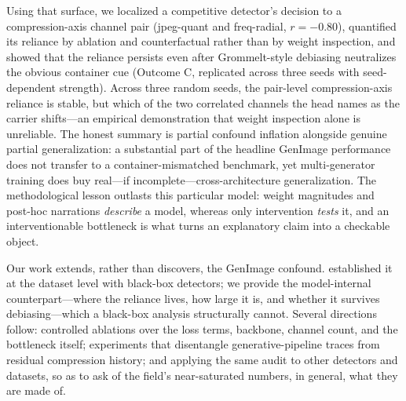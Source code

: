 Using that surface, we localized a competitive detector's decision to a compression-axis channel pair (jpeg-quant and freq-radial, $r{=}{-}0.80$), quantified its reliance by ablation and counterfactual rather than by weight inspection, and showed that the reliance persists even after Grommelt-style debiasing neutralizes the obvious container cue (Outcome C, replicated across three seeds with seed-dependent strength). Across three random seeds, the pair-level compression-axis reliance is stable, but which of the two correlated channels the head names as the carrier shifts---an empirical demonstration that weight inspection alone is unreliable. The honest summary is partial confound inflation alongside genuine partial generalization: a substantial part of the headline GenImage performance does not transfer to a container-mismatched benchmark, yet multi-generator training does buy real---if incomplete---cross-architecture generalization. The methodological lesson outlasts this particular model: weight magnitudes and post-hoc narrations \emph{describe} a model, whereas only intervention \emph{tests} it, and an interventionable bottleneck is what turns an explanatory claim into a checkable object.

Our work extends, rather than discovers, the GenImage confound. \citet{grommelt2024fakejpeg} established it at the dataset level with black-box detectors; we provide the model-internal counterpart---where the reliance lives, how large it is, and whether it survives debiasing---which a black-box analysis structurally cannot. Several directions follow: controlled ablations over the loss terms, backbone, channel count, and the bottleneck itself; experiments that disentangle generative-pipeline traces from residual compression history; and applying the same audit to other detectors and datasets, so as to ask of the field's near-saturated numbers, in general, what they are made of.
